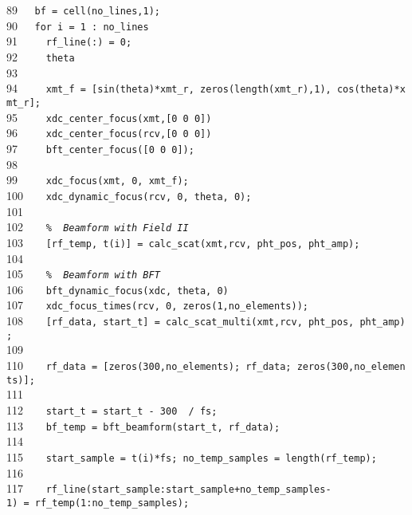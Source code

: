 \documentclass{manual}
\begin{document}
{89{\tt~~~}{\tt bf~=~cell(no\_lines,1);}\\
90{\tt~~~}{\tt for~i~=~1~:~no\_lines}\\
91{\tt~~~}{\tt ~~rf\_line(:)~=~0;~~}\\
92{\tt~~~}{\tt ~~theta}\\
93{\tt~~~}{\tt ~~}\\
94{\tt~~~}{\tt ~~xmt\_f~=~[sin(theta)*xmt\_r,~zeros(length(xmt\_r),1),~cos(theta)*xmt\_r];}\\
95{\tt~~~}{\tt ~~xdc\_center\_focus(xmt,[0~0~0])}\\
96{\tt~~~}{\tt ~~xdc\_center\_focus(rcv,[0~0~0])}\\
97{\tt~~~}{\tt ~~bft\_center\_focus([0~0~0]);}\\
98{\tt~~~}{\tt ~~}\\
99{\tt~~~}{\tt ~~xdc\_focus(xmt,~0,~xmt\_f);}\\
100{\tt~~}{\tt ~~xdc\_dynamic\_focus(rcv,~0,~theta,~0);}\\
101{\tt~~}{\tt ~~}\\
102{\tt~~}{\tt ~~{\sl \%~~Beamform~with~Field~II}}\\
103{\tt~~}{\tt ~~[rf\_temp,~t(i)]~=~calc\_scat(xmt,rcv,~pht\_pos,~pht\_amp);}\\
104{\tt~~}{\tt ~~}\\
105{\tt~~}{\tt ~~{\sl \%~~Beamform~with~BFT}}\\
106{\tt~~}{\tt ~~bft\_dynamic\_focus(xdc,~theta,~0)}\\
107{\tt~~}{\tt ~~xdc\_focus\_times(rcv,~0,~zeros(1,no\_elements));}\\
108{\tt~~}{\tt ~~[rf\_data,~start\_t]~=~calc\_scat\_multi(xmt,rcv,~pht\_pos,~pht\_amp);}\\
109{\tt~~}{\tt ~~}\\
110{\tt~~}{\tt ~~rf\_data~=~[zeros(300,no\_elements);~rf\_data;~zeros(300,no\_elements)];}\\
111{\tt~~}{\tt }\\
112{\tt~~}{\tt ~~start\_t~=~start\_t~-~300~~/~fs;}\\
113{\tt~~}{\tt ~~bf\_temp~=~bft\_beamform(start\_t,~rf\_data);}\\
114{\tt~~}{\tt ~~}\\
115{\tt~~}{\tt ~~start\_sample~=~t(i)*fs;~no\_temp\_samples~=~length(rf\_temp);}\\
116{\tt~~}{\tt ~~}\\
117{\tt~~}{\tt ~~rf\_line(start\_sample:start\_sample+no\_temp\_samples-1)~=~rf\_temp(1:no\_temp\_samples);}\\
}
\end{document}
